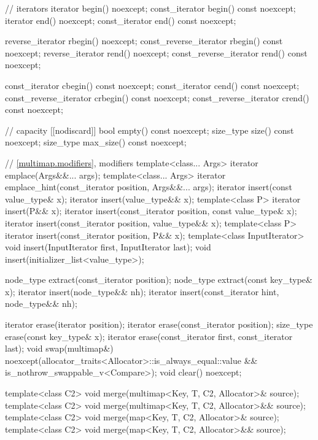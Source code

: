 \begin{codeblock}
{{    // iterators
    iterator               begin() noexcept;
    const_iterator         begin() const noexcept;
    iterator               end() noexcept;
    const_iterator         end() const noexcept;

    reverse_iterator       rbegin() noexcept;
    const_reverse_iterator rbegin() const noexcept;
    reverse_iterator       rend() noexcept;
    const_reverse_iterator rend() const noexcept;

    const_iterator         cbegin() const noexcept;
    const_iterator         cend() const noexcept;
    const_reverse_iterator crbegin() const noexcept;
    const_reverse_iterator crend() const noexcept;

    // capacity
    [[nodiscard]] bool empty() const noexcept;
    size_type size() const noexcept;
    size_type max_size() const noexcept;

    // \ref{multimap.modifiers}, modifiers
    template<class... Args> iterator emplace(Args&&... args);
    template<class... Args> iterator emplace_hint(const_iterator position, Args&&... args);
    iterator insert(const value_type& x);
    iterator insert(value_type&& x);
    template<class P> iterator insert(P&& x);
    iterator insert(const_iterator position, const value_type& x);
    iterator insert(const_iterator position, value_type&& x);
    template<class P> iterator insert(const_iterator position, P&& x);
    template<class InputIterator>
      void insert(InputIterator first, InputIterator last);
    void insert(initializer_list<value_type>);

    node_type extract(const_iterator position);
    node_type extract(const key_type& x);
    iterator insert(node_type&& nh);
    iterator insert(const_iterator hint, node_type&& nh);

    iterator  erase(iterator position);
    iterator  erase(const_iterator position);
    size_type erase(const key_type& x);
    iterator  erase(const_iterator first, const_iterator last);
    void      swap(multimap&)
      noexcept(allocator_traits<Allocator>::is_always_equal::value &&
               is_nothrow_swappable_v<Compare>);
    void      clear() noexcept;

    template<class C2>
      void merge(multimap<Key, T, C2, Allocator>& source);
    template<class C2>
      void merge(multimap<Key, T, C2, Allocator>&& source);
    template<class C2>
      void merge(map<Key, T, C2, Allocator>& source);
    template<class C2>
      void merge(map<Key, T, C2, Allocator>&& source);

}}
\end{codeblock}
